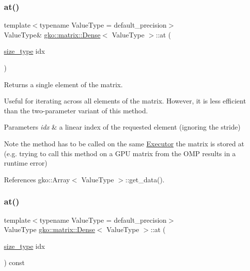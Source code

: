 \subsubsection{\texorpdfstring{at()}{at()}\hspace{0.1cm}{\footnotesize\ttfamily [3/4]}}
{\footnotesize\ttfamily template$<$typename Value\+Type = default\+\_\+precision$>$ \\
Value\+Type\& \hyperlink{classgko_1_1matrix_1_1Dense}{gko\+::matrix\+::\+Dense}$<$ Value\+Type $>$\+::at (\begin{DoxyParamCaption}\item[{\hyperlink{namespacegko_a6e5c95df0ae4e47aab2f604a22d98ee7}{size\+\_\+type}}]{idx }\end{DoxyParamCaption})\hspace{0.3cm}{\ttfamily [noexcept]}}



Returns a single element of the matrix. 

Useful for iterating across all elements of the matrix. However, it is less efficient than the two-\/parameter variant of this method.


\begin{DoxyParams}{Parameters}
{\em idx} & a linear index of the requested element (ignoring the stride)\\
\hline
\end{DoxyParams}
\begin{DoxyNote}{Note}
the method has to be called on the same \hyperlink{classgko_1_1Executor}{Executor} the matrix is stored at (e.\+g. trying to call this method on a G\+PU matrix from the O\+MP results in a runtime error) 
\end{DoxyNote}


References gko\+::\+Array$<$ Value\+Type $>$\+::get\+\_\+data().

\mbox{\label{classgko_1_1matrix_1_1Dense_a34ba8a7f392c65c481a93d9374cb5769}} 
\subsubsection{\texorpdfstring{at()}{at()}\hspace{0.1cm}{\footnotesize\ttfamily [4/4]}}
{\footnotesize\ttfamily template$<$typename Value\+Type = default\+\_\+precision$>$ \\
Value\+Type \hyperlink{classgko_1_1matrix_1_1Dense}{gko\+::matrix\+::\+Dense}$<$ Value\+Type $>$\+::at (\begin{DoxyParamCaption}\item[{\hyperlink{namespacegko_a6e5c95df0ae4e47aab2f604a22d98ee7}{size\+\_\+type}}]{idx }\end{DoxyParamCaption}) const\hspace{0.3cm}{\ttfamily [noexcept]}}



